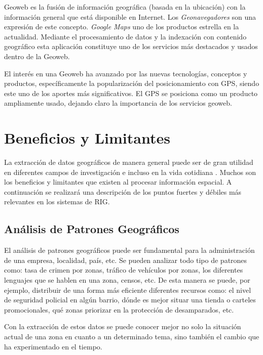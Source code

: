 \documentclass{llncs}
\begin{document}
Geoweb es la fusión de información geográfica (basada en la ubicación) con la
información general que está disponible en Internet. Los \emph{Geonavegadores}
son una expresión de este concepto. \emph{Google Maps} uno de los productos
estrella en la actualidad. Mediante el procesamiento de datos y la indexación
con contenido geográfico esta aplicación constituye uno de los servicios más
destacados y usados dentro de la Geoweb.

El interés en una Geoweb ha avanzado por las nuevas tecnologías, conceptos y
productos, específicamente la popularización del posicionamiento con GPS,
siendo este uno de los aportes más significativos. El GPS se posiciona como un
producto ampliamente usado, dejando claro la importancia de los servicios
geoweb.

\newpage

\section{Beneficios y Limitantes}\label{sec:pros-and-cons}

La extracción de datos geográficos de manera general puede ser de gran utilidad
en diferentes campos de investigación e incluso en la vida cotidiana
\cite{artz2009}. Muchos son los beneficios y limitantes que existen al procesar
información espacial. A continuación se realizará una descripción
de los puntos fuertes y débiles más relevantes en los sistemas de RIG.

\subsection{Análisis de Patrones Geográficos}\label{sec:patr}

El análisis de patrones geográficos puede ser fundamental para la administración
de una empresa, localidad, país, etc. Se pueden analizar todo tipo de patrones
como: tasa de crimen por zonas, tráfico de vehículos por zonas, los diferentes
lenguajes que se hablen en una zona, censos, etc. De esta manera se puede, por ejemplo,
distribuir de una forma más eficiente diferentes recursos como: el nivel de seguridad
policial en algún barrio, dónde es mejor situar una tienda o carteles promocionales,
qué zonas priorizar en la protección de desamparados, etc.

Con la extracción de estos datos se puede conocer mejor no solo la situación
actual de una zona en cuanto a un determinado tema, sino también el cambio que
ha experimentado en el tiempo.
\end{document}
